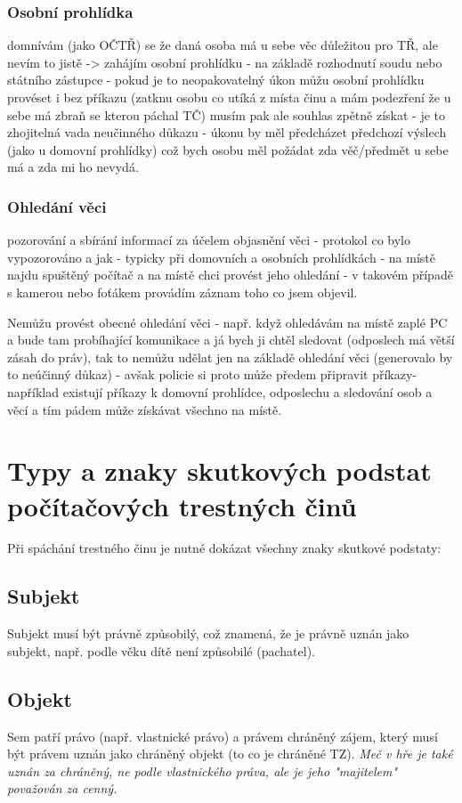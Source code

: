 \subsubsection*{Osobní prohlídka}
domnívám (jako OČTŘ) se že daná osoba má u sebe věc důležitou pro TŘ, ale nevím to jistě -> zahájím osobní prohlídku - na základě rozhodnutí soudu nebo státního zástupce - pokud je to neopakovatelný úkon můžu osobní prohlídku provéset i bez příkazu (zatknu osobu co utíká z místa činu a mám podezření že u sebe má zbraň se kterou páchal TČ) musím pak ale souhlas zpětně získat - je to zhojitelná vada neučinného důkazu - úkonu by měl předcházet předchozí výslech (jako u domovní prohlídky) což bych osobu měl požádat zda věč/předmět u sebe má a zda mi ho nevydá.

\subsubsection*{Ohledání věci}
pozorování a sbírání informací za účelem objasnění věci - protokol co bylo vypozorováno a jak - typicky při domovních a osobních prohlídkách - na místě najdu spuštěný počítač a na místě chci provést jeho ohledání - v takovém případě s kamerou nebo foťákem provádím záznam toho co jsem objevil.

Nemůžu provést obecné ohledání věci - např. když ohledávám na místě zaplé PC a bude tam probíhající komunikace a já bych ji chtěl sledovat (odposlech má větší zásah do práv), tak to nemůžu udělat jen na základě ohledání věci (generovalo by to neúčinný důkaz) - avšak policie si proto může předem připravit příkazy- například existují příkazy k domovní prohlídce, odposlechu a sledování osob a věcí a tím pádem může získávat všechno na místě.


\clearpage
\section{Typy a znaky skutkových podstat počítačových trestných činů}
Při spáchání trestného činu je nutné dokázat všechny znaky skutkové podstaty:

\subsection*{Subjekt}
Subjekt musí být právně způsobilý, což znamená, že je právně uznán jako subjekt, např. podle věku dítě není způsobilé (pachatel).

\subsection*{Objekt}
Sem patří právo (např. vlastnické právo) a právem chráněný zájem, který musí být právem uznán jako chráněný objekt (to co je chráněné TZ). \textit{Meč v hře je také uznán za chráněný, ne podle vlastnického práva, ale je jeho "majitelem" považován za cenný.}

